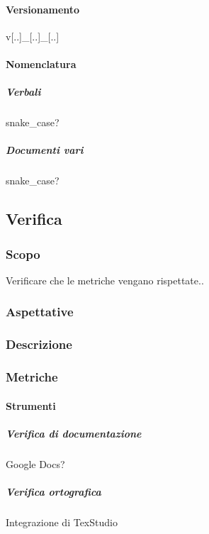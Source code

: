 			\paragraph{Versionamento}
			v[..]\_[..]\_[..]	%
			
			\paragraph{Nomenclatura}
			
			\subparagraph{Verbali}
			snake\_case?
				
			\subparagraph{Documenti vari}	
			snake\_case?

	\subsection{Verifica}
		
		\subsubsection{Scopo}
		Verificare che le metriche vengano rispettate..
		
		\subsubsection{Aspettative}
		
		\subsubsection{Descrizione}
		
		\subsubsection{Metriche}
		
			
			
			
			\paragraph{Strumenti}
			
			\subparagraph{Verifica di documentazione}
			Google Docs?
			
			\subparagraph{Verifica ortografica}
			Integrazione di TexStudio
			

